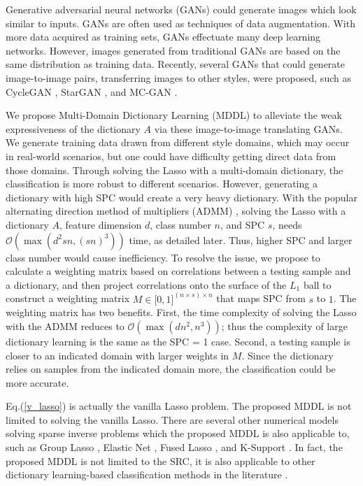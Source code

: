 \documentclass{article}
\begin{document}
Generative adversarial neural networks (GANs) \cite{goodfellow2014generative} could generate images which look similar to inputs. GANs are often used as techniques of data augmentation. With more data acquired as training sets, GANs effectuate many deep learning networks. However, images generated from traditional GANs are based on the same distribution as training data. Recently, several GANs that could generate image-to-image pairs, transferring images to other styles, were proposed, such as CycleGAN \cite{zhu2017unpaired}, StarGAN \cite{choi2018stargan}, and MC-GAN \cite{azadi2018multi}.

We propose Multi-Domain Dictionary Learning (MDDL) to alleviate the weak expressiveness of the dictionary $A$ via these image-to-image translating GANs. We generate training data drawn from different style domains, which may occur in real-world scenarios, but one could have difficulty getting direct data from those domains. Through solving the Lasso with a multi-domain dictionary, the classification is more robust to different scenarios. However, generating a dictionary with high SPC would create a very heavy dictionary. With the popular alternating direction method of multipliers (ADMM) \cite{boyd2011distributed} \cite{lu2018unified}, solving the Lasso with a dictionary $A$, feature dimension $d$, class number $n$, and SPC $s$, needs $\mathcal{O}(\max( d^2 sn, (sn)^{3}))$ time, as detailed later. Thus, higher SPC and larger class number would cause inefficiency. To resolve the issue, we propose to calculate a weighting matrix based on correlations between a testing sample and a dictionary, and then project correlations onto the surface of the $L_1$ ball to construct a weighting matrix $M \in \lbrack 0,1 \rbrack ^{(n \times s) \times n}$ that maps SPC from $s$ to $1$. The weighting matrix has two benefits. First, the time complexity of solving the Lasso with the ADMM reduces to $\mathcal{O}(\max( dn^{2}, n^{3}))$; thus the complexity of large dictionary learning is the same as the SPC = 1 case. Second, a testing sample is closer to an indicated domain with larger weights in $M$. Since the dictionary relies on samples from the indicated domain more, the classification could be more accurate.

Eq.(\ref{v_lasso}) is actually the vanilla Lasso problem. The proposed MDDL is not limited to solving the vanilla Lasso. There are several other numerical models solving sparse inverse problems which the proposed MDDL is also applicable to, such as Group Lasso \cite{yuan2006model}, Elastic Net \cite{zou2005regularization}, Fused Lasso \cite{tibshirani2005sparsity}, and K-Support \cite{lai2014efficient}. In fact, the proposed MDDL is not limited to the SRC, it is also applicable to other dictionary learning-based classification methods in the literature \cite{zhang2011iccv} \cite{yang2011cvpr} \cite{deng2012extended} \cite{cai2016cvpr} \cite{wu2016occlusion} \cite{gao2017semi} \cite{tang2018structured}.
\end{document}
